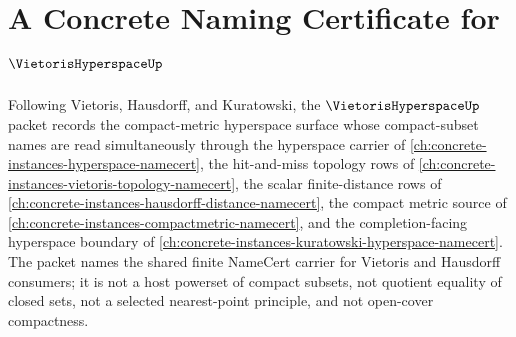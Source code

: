 \chapter{A Concrete Naming Certificate for $\VietorisHyperspaceUp$}
\label{ch:concrete-instances-vietoris-hyperspace-namecert}

Following Vietoris, Hausdorff, and Kuratowski, the $\VietorisHyperspaceUp$ packet records the compact-metric hyperspace surface whose compact-subset names are read simultaneously through the hyperspace carrier of \autoref{ch:concrete-instances-hyperspace-namecert}, the hit-and-miss topology rows of \autoref{ch:concrete-instances-vietoris-topology-namecert}, the scalar finite-distance rows of \autoref{ch:concrete-instances-hausdorff-distance-namecert}, the compact metric source of \autoref{ch:concrete-instances-compactmetric-namecert}, and the completion-facing hyperspace boundary of \autoref{ch:concrete-instances-kuratowski-hyperspace-namecert}. The packet names the shared finite NameCert carrier for Vietoris and Hausdorff consumers; it is not a host powerset of compact subsets, not quotient equality of closed sets, not a selected nearest-point principle, and not open-cover compactness.

